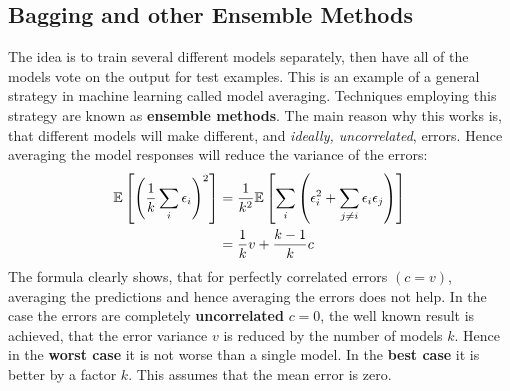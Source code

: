 \begin{multicols}{2}
	\subsection{Bagging and other Ensemble Methods}
	The idea is to train several different models separately, then have all of the models vote on the output for test examples.
	This is an example of a general strategy in machine learning called model averaging. Techniques employing this strategy are known as \textbf{ensemble methods}.
	The main reason why this works is, that different models will make different, and \emph{ideally, uncorrelated}, errors. Hence averaging the model responses will reduce the variance of the errors:
	\begin{align*}
	\mathbb{E}\left[\left(\frac{1}{k}\sum_i\epsilon_i\right)^2\right]
	&= \frac{1}{k^2}\mathbb{E}\left[\sum_i\left(\epsilon_i^2+\sum_{j\neq i}\epsilon_i\epsilon_j\right)\right]\\
	&= \frac{1}{k}v+\frac{k-1}{k}c
	\end{align*}
	The formula clearly shows, that for perfectly correlated errors $(c=v)$, averaging the predictions and hence averaging the errors does not help.
	In the case the errors are completely \textbf{uncorrelated} $c=0$, the well known result is achieved, that the error variance $v$ is reduced by the number of models $k$.
	Hence in the \textbf{worst case} it is not worse than a single model.
	In the \textbf{best case} it is better by a factor $k$. This assumes that the mean error is zero.\\


\end{multicols}
